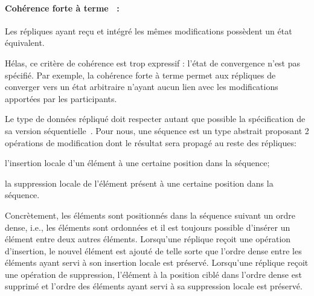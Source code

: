 \paragraph{Cohérence forte à terme~\cite{shapiro2011conflict} :} Les répliques
ayant reçu et intégré les mêmes modifications possèdent un état équivalent.

\noindent Hélas, ce critère de cohérence est trop expressif : l'état de
convergence n'est pas spécifié. Par exemple, la cohérence forte à terme permet
aux répliques de converger vers un état arbitraire n'ayant aucun lien avec les
modifications apportées par les participants.



Le type de données répliqué doit respecter autant que possible la spécification
de sa version séquentielle~\cite{bieniusa2012brief}. Pour nous, une séquence est
un type abstrait proposant 2 opérations de modification dont le résultat sera
propagé au reste des répliques:
\begin{inparaenum}[(i)]
\item l'insertion locale d'un élément à une certaine position dans la séquence; 
\item la suppression locale de l'élément présent à une certaine position dans la
  séquence.
\end{inparaenum}
Concrètement, les éléments sont positionnés dans la séquence suivant un ordre
dense, i.e., les éléments sont ordonnées et il est toujours possible d'insérer
un élément entre deux autres éléments. Lorsqu'une réplique reçoit une opération
d'insertion, le nouvel élément est ajouté de telle sorte que l'ordre dense entre
les éléments ayant servi à son insertion locale est préservé. Lorsqu'une
réplique reçoit une opération de suppression, l'élément à la position ciblé dans
l'ordre dense est supprimé et l'ordre des éléments ayant servi à sa suppression
locale est préservé. 



